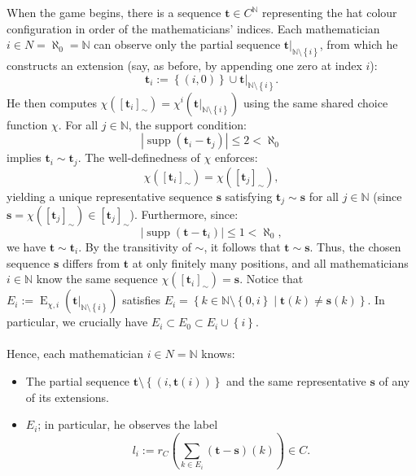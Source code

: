 \documentclass[11pt, a4paper, oneside]{article}
\theoremstyle{remark}
\theoremstyle{lemma}
\begin{document}
When the game begins, there is a sequence \(\mathbf{t} \in C^{\mathbb{N}}\) representing the hat colour configuration in order of the mathematicians’ indices. Each mathematician \(i \in N = \aleph_0 = \mathbb{N}\) can observe only the partial sequence \(\left.\mathbf{t}\right|_{\mathbb{N} \setminus \left\{i\right\}}\), from which he constructs an extension (say, as before, by appending one zero at index \(i\)):
\[
\mathbf{t}_i := \left\{\left(i, 0\right)\right\} \cup \left.\mathbf{t}\right|_{\mathbb{N} \setminus \left\{i\right\}}.
\]
He then computes \(\chi\left(\left[\mathbf{t}_i\right]_{\sim}\right) = \chi^{i}\left(\left.\mathbf{t}\right|_{\mathbb{N} \setminus \left\{i\right\}}\right)\) using the same shared choice function \(\chi\). For all \(j \in \mathbb{N}\), the support condition:
\[
\left|\operatorname{supp}\left(\mathbf{t}_i - \mathbf{t}_j\right)\right| \leq 2 < \aleph_0
\]
implies \(\mathbf{t}_i \sim \mathbf{t}_j\). The well-definedness of \(\chi\) enforces:
\[
\chi\left(\left[\mathbf{t}_i\right]_{\sim}\right) = \chi\left(\left[\mathbf{t}_j\right]_{\sim}\right),
\]
yielding a unique representative sequence \(\mathbf{s}\) satisfying \(\mathbf{t}_j \sim \mathbf{s}\) for all \(j \in \mathbb{N}\) (since \(\mathbf{s} = \chi\left(\left[\mathbf{t}_j\right]_{\sim}\right) \in \left[\mathbf{t}_j\right]_{\sim}\)). Furthermore, since:
\[
\left|\operatorname{supp}\left(\mathbf{t} - \mathbf{t}_i\right)\right| \leq 1 < \aleph_0,
\]
we have \(\mathbf{t} \sim \mathbf{t}_i\). By the transitivity of \(\sim\), it follows that \(\mathbf{t} \sim \mathbf{s}\). Thus, the chosen sequence \(\mathbf{s}\) differs from \(\mathbf{t}\) at only finitely many positions, and all mathematicians \(i \in \mathbb{N}\) know the same sequence \(\chi\left(\left[\mathbf{t}_i\right]_{\sim}\right) = \mathbf{s}\). Notice that \(E_i := \operatorname{E}_{\chi, i}\left(\left.\mathbf{t}\right|_{\mathbb{N} \setminus \left\{i\right\}}\right)\) satisfies \(E_i = \left\{k \in \mathbb{N} \setminus \left\{0, i\right\} \mid \mathbf{t}(k) \neq \mathbf{s}(k)\right\}\). In particular, we crucially have \(E_i \subset E_0 \subset E_i \cup \left\{i\right\}\).
\\\\
Hence, each mathematician \(i \in N = \mathbb{N}\) knows:
\begin{itemize}
    \item The partial sequence \(\mathbf{t} \setminus \left\{\left(i, \mathbf{t}(i)\right)\right\}\) and the same representative \(\mathbf{s}\) of any of its extensions.
    \item \(E_i\); in particular, he observes the label
    \[
    l_i := r_{C}\left(\sum_{k \in E_i} \left(\mathbf{t} - \mathbf{s}\right)(k)\right) \in C.
    \]
\end{itemize}
\end{document}
